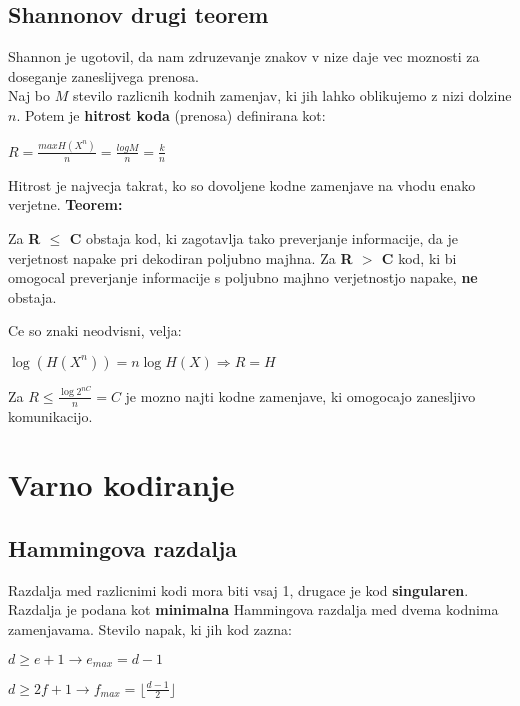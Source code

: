 \documentclass{article}
\begin{document}
\begin{multicols}{4}
	\subsection{Shannonov drugi teorem}
	Shannon je ugotovil, da nam zdruzevanje znakov v nize daje vec moznosti za doseganje zaneslijvega prenosa.\\
	Naj bo $M$ stevilo razlicnih kodnih zamenjav, ki jih lahko oblikujemo z nizi dolzine $n$. Potem je \textbf{hitrost koda}
	(prenosa)  definirana kot:
	\begin{center}
		\begin{math}
			R = \frac{max H(X^n)}{n} = \frac{log M}{n} = \frac{k}{n}
		\end{math}
	\end{center}
	Hitrost je najvecja takrat, ko so dovoljene kodne zamenjave na vhodu enako verjetne.
	\textbf{Teorem:}\\
	\begin{center}
		Za \textbf{R $\leq$ C} obstaja kod, ki zagotavlja tako preverjanje informacije, da je verjetnost napake pri
		dekodiran  poljubno majhna. Za \textbf{R $>$ C} kod, ki bi omogocal preverjanje informacije s poljubno majhno
		verjetnostjo napake, \textbf{ne} obstaja.
	\end{center}
	Ce so znaki neodvisni, velja:
	\begin{center}
		\begin{math}
			\log(H(X^n)) = n \log H(X) \Rightarrow R = H
		\end{math}
	\end{center}
	Za $R \leq \frac{\log 2^{nC}}{n} = C$ je mozno najti kodne zamenjave, ki omogocajo zanesljivo komunikacijo.

	\section{Varno kodiranje}

	\subsection{Hammingova razdalja}
	Razdalja med razlicnimi kodi mora biti vsaj 1, drugace je kod \textbf{singularen}.
	Razdalja je podana kot \textbf{minimalna} Hammingova razdalja med dvema kodnima zamenjavama.
	Stevilo napak, ki jih kod zazna:
	\begin{center}
		$d \geq e + 1 \rightarrow e_{max} = d-1$
	\end{center}
	\begin{center}
		$d \geq 2f + 1 \rightarrow f_{max} = \lfloor \frac{d-1}{2} \rfloor$
	\end{center}


\end{multicols}
\end{document}

